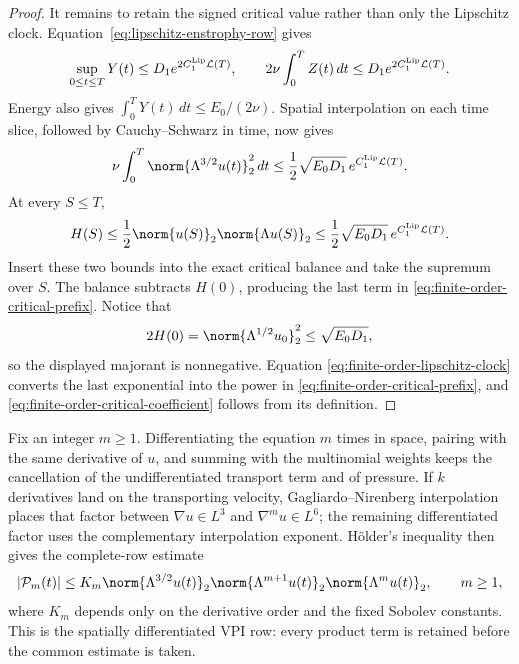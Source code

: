 \begin{proof}
It remains to retain the signed critical value rather than only the
Lipschitz clock.  Equation~\eqref{eq:lipschitz-enstrophy-row} gives
\begin{equation*}
 \sup_{0\le t\le T}Y(t)
 \le D_1e^{2C_1^{\rm Lip}\mathcal L(T)},
 \qquad
 2\nu\int_0^TZ(t)\,dt
 \le D_1e^{2C_1^{\rm Lip}\mathcal L(T)}.
\end{equation*}
Energy also gives
\(\int_0^TY(t)\,dt\le E_0/(2\nu)\).  Spatial interpolation on each time
slice, followed by Cauchy--Schwarz in time, now gives
\[
 \nu\int_0^T\norm{\Lambda^{3/2}u(t)}_2^2\,dt
 \le\frac12\sqrt{E_0D_1}\,
 e^{C_1^{\rm Lip}\mathcal L(T)}.
\]
At every \(S\le T\),
\[
 H(S)
 \le\frac12\norm{u(S)}_2\norm{\Lambda u(S)}_2
 \le\frac12\sqrt{E_0D_1}\,
 e^{C_1^{\rm Lip}\mathcal L(T)}.
\]
Insert these two bounds into the exact critical balance and take the supremum
over \(S\).  The balance subtracts \(H(0)\), producing the last term in
\eqref{eq:finite-order-critical-prefix}.  Notice that
\[
 2H(0)=\norm{\Lambda^{1/2}u_0}_2^2
 \le\sqrt{E_0D_1},
\]
so the displayed majorant is nonnegative.  Equation
\eqref{eq:finite-order-lipschitz-clock} converts the last exponential into
the power in
\eqref{eq:finite-order-critical-prefix}, and
\eqref{eq:finite-order-critical-coefficient} follows from its definition.
\end{proof}

Fix an integer \(m\ge1\).  Differentiating the equation \(m\) times in
space, pairing with the same derivative of \(u\), and summing with the
multinomial weights keeps the cancellation of the undifferentiated transport
term and of pressure.  If \(k\) derivatives land on the transporting
velocity, Gagliardo--Nirenberg interpolation places that factor between
\(\nabla u\in L^3\) and \(\nabla^m u\in L^6\); the remaining differentiated
factor uses the complementary interpolation exponent.  H\"older's inequality
then gives the complete-row estimate
\begin{equation}
 |\mathcal P_m(t)|
 \le K_m
 \norm{\Lambda^{3/2}u(t)}_2
 \norm{\Lambda^{m+1}u(t)}_2
 \norm{\Lambda^m u(t)}_2,
 \qquad m\ge1,
 \label{eq:critical-coefficient-row-estimate}
\end{equation}
where \(K_m\) depends only on the derivative order and the fixed Sobolev
constants.  This is the spatially differentiated VPI row: every product term
is retained before the common estimate is taken.

